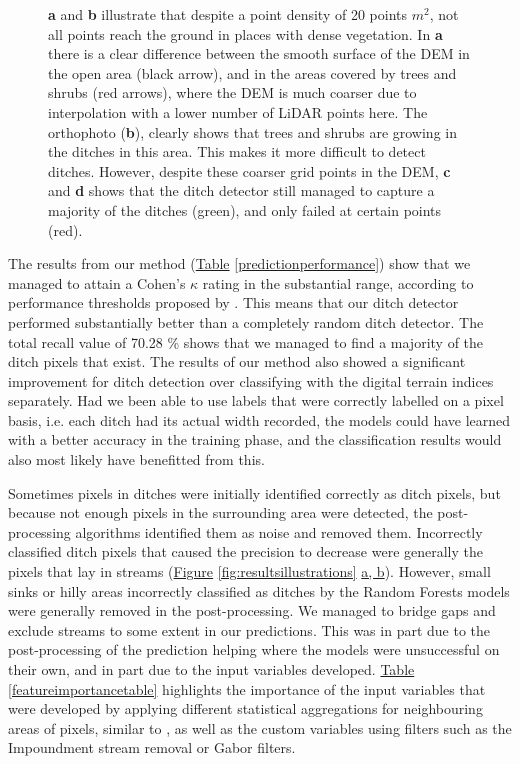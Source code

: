 \documentclass[]{interact}
\theoremstyle{plain}%
\theoremstyle{definition}
\theoremstyle{remark}
\begin{document}
\begin{figure} [!htb]
    \caption{\textbf{a} and \textbf{b} illustrate that despite a point density of 20 points $m^2$, not all points reach the ground in places with dense vegetation. In \textbf{a} there is a clear difference between the smooth surface of the DEM in the open area (black arrow), and in the areas covered by trees and shrubs (red arrows), where the DEM is much coarser due to interpolation with a lower number of LiDAR points here. The orthophoto (\textbf{b}), clearly shows that trees and shrubs are growing in the ditches in this area. This makes it more difficult to detect ditches. However, despite these coarser grid points in the DEM, \textbf{c} and \textbf{d} shows that the ditch detector still managed to capture a majority of the ditches (green), and only failed at certain points (red).}
    \label{fig:resultstreesbushes}
\end{figure}

The results from our method (\hyperref[predictionperformance]{Table} \ref{predictionperformance}) show that we managed to attain a Cohen's $\kappa$ rating in the substantial range, according to performance thresholds proposed by \citet{kappaanalysis}. This means that our ditch detector performed substantially better than a completely random ditch detector. The total recall value of 70.28 \% shows that we managed to find a majority of the ditch pixels that exist. The results of our method also showed a significant improvement for ditch detection over classifying with the digital terrain indices separately. Had we been able to use labels that were correctly labelled on a pixel basis, i.e. each ditch had its actual width recorded, the models could have learned with a better accuracy in the training phase, and the classification results would also most likely have benefitted from this.

Sometimes pixels in ditches were initially identified correctly as ditch pixels, but because not enough pixels in the surrounding area were detected, the post-processing algorithms identified them as noise and removed them. Incorrectly classified ditch pixels that caused the precision to decrease were generally the pixels that lay in streams (\hyperref[fig:resultsillustrations]{Figure} \ref{fig:resultsillustrations} \hyperref[fig:resultsillustrations]{a, b}). However, small sinks or hilly areas incorrectly classified as ditches by the Random Forests models were generally removed in the post-processing. We managed to bridge gaps and exclude streams to some extent in our predictions. This was in part due to the post-processing of the prediction helping where the models were unsuccessful on their own, and in part due to the input variables developed. \hyperref[featureimportancetable]{Table} \ref{featureimportancetable} highlights the importance of the input variables that were developed by applying different statistical aggregations for neighbouring areas of pixels, similar to \citet{roelens}, as well as the custom variables using filters such as the Impoundment stream removal or Gabor filters.
\end{document}
